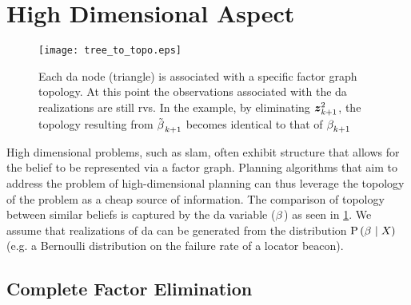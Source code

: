 \section{High Dimensional Aspect}\label{sec:high_dim}

\begin{figure}[h]
	\centering
	\texttt{[image: tree\_to\_topo.eps]}
	\caption{Each da node (triangle) is associated with a specific factor graph topology. At this point the observations associated with the da realizations are still \glspl{rv}. In the example, by eliminating $\boldsymbol z_{k+1}^{2}$, the topology resulting from $\tilde{\beta_{}^{}}_{k+1}$ becomes identical to that of $\beta_{k+1}^{}$}
	\label{fig:topology}
\end{figure}
High dimensional problems, such as \gls{slam}, often exhibit structure that allows for the belief to be represented via a factor graph. Planning algorithms that aim to address the problem of high-dimensional planning can thus leverage the topology of the problem as a cheap source of information. The comparison of topology between similar beliefs is captured by the \gls{da} variable ($\beta_{}^{}$) as seen in \cref{fig:topology}. We assume that realizations of \gls{da} can be generated from the distribution $\mathrm{P}\left({\beta_{}^{}}\mid{\ensuremath{X_{}}}\right)$ (e.g. a Bernoulli distribution on the failure rate of a locator beacon).

\subsection{Complete Factor Elimination}\label{sec:complete_elimination}

